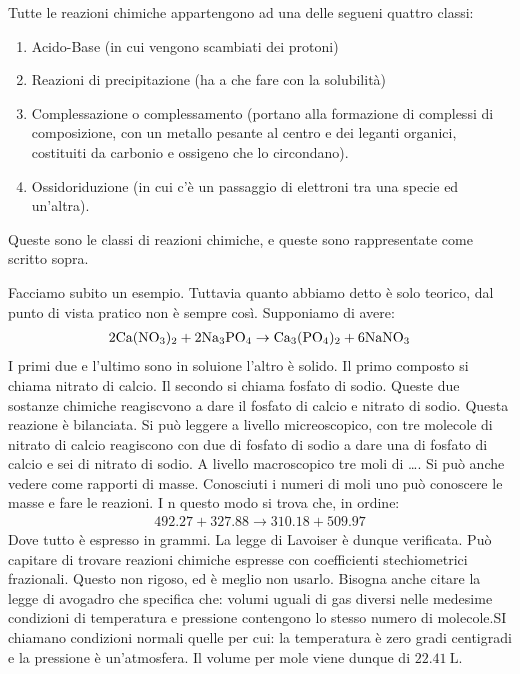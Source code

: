 \documentclass[../AppuntiChimica]{subfiles}
\begin{document}
	Tutte le reazioni chimiche appartengono ad una delle segueni quattro classi:
	\begin{enumerate}
		\item Acido-Base (in cui vengono scambiati dei protoni)
		\item Reazioni di precipitazione (ha a che fare con la solubilità)
		\item Complessazione o complessamento (portano alla formazione di complessi di composizione, con un metallo pesante al centro e dei leganti organici, costituiti da carbonio e ossigeno che lo circondano).
		\item Ossidoriduzione (in cui c'è un passaggio di elettroni tra una specie ed un'altra).
	\end{enumerate}
	Queste sono le classi di reazioni chimiche, e queste sono rappresentate come scritto sopra.
	
	Facciamo subito un esempio. Tuttavia quanto abbiamo detto è solo teorico, dal punto di vista pratico non è sempre così. Supponiamo di avere:
	\begin{gather}
	2\text{Ca}(\text{N}\text{O}_{3})_{2}+2\text{Na}_{3}\text{P}\text{O}_{4}\to \text{Ca}_{3}(\text{P}\text{O}_{4})_{2}+6\text{Na}\text{N}\text{O}_{3}
	\end{gather}
	I primi due e l'ultimo sono in soluione l'altro è solido. Il primo composto si chiama nitrato di calcio. Il secondo si chiama fosfato di sodio. Queste due sostanze chimiche reagiscvono a dare il fosfato di calcio e nitrato di sodio. Questa reazione è bilanciata. Si può leggere a livello micreoscopico, con tre molecole di nitrato di calcio reagiscono con due di fosfato di sodio a dare una di fosfato di calcio e sei di nitrato di sodio. A livello macroscopico tre moli di \dots. Si può anche vedere come rapporti di masse. Conosciuti i numeri di moli uno può conoscere le masse e fare le reazioni. I n questo modo si trova che, in ordine:
	\begin{gather}
	492.27+327.88\to 310.18+509.97
	\end{gather}
	Dove tutto è espresso in grammi. La legge di Lavoiser è dunque verificata. Può capitare di trovare reazioni chimiche espresse con coefficienti stechiometrici frazionali. Questo non  rigoso, ed è meglio non usarlo. Bisogna anche citare la legge di avogadro che specifica che: volumi uguali di gas diversi nelle medesime condizioni di temperatura e pressione contengono lo stesso numero di molecole.SI chiamano condizioni normali quelle per cui: la temperatura è zero gradi centigradi e la pressione è un'atmosfera. Il volume per mole viene dunque di $ \SI{22.41}{\liter} $.
	
\end{document}
